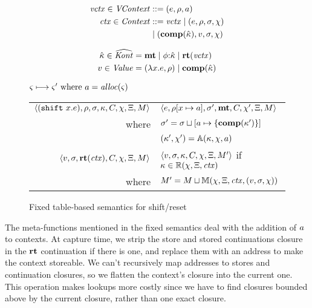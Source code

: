 \begin{center}
  \begin{minipage}{0.50\linewidth}
    \begin{align*}
      \mathit{vctx} \in \mathit{VContext} &::= (e,\rho,a) \\
      \mathit{ctx} \in \mathit{Context} &::= \mathit{vctx} \mathrel{\mid}
      (e,\rho,\sigma,\chi) \\ &\mathrel{\mid} (\mathbf{comp}(\hat{\kappa}),
      v, \sigma, \chi)
    \end{align*}
  \end{minipage}
  \begin{minipage}{0.45\linewidth}
    \begin{align*}
      \hat{\kappa} \in \widehat{\mathit{Kont}} &= \mathbf{mt} \mathrel{\mid} \phi{\tt :} \hat{\kappa} \mathrel{\mid} \mathbf{rt}(\mathit{vctx}) \\
      v \in \mathit{Value} &= (\lambda{} x. e, \rho) \mathrel{\mid}
      \mathbf{comp}(\hat{\kappa})
    \end{align*}
  \end{minipage}
\end{center}

\begin{figure*}
  \centering
  $\varsigma \longmapsto \varsigma' \text{ where } a = \mathit{alloc}(\varsigma)$ \\
  \begin{tabular}{r|l}
    \hline
    $\langle (\texttt{shift}\ x. e), \rho, \sigma, \kappa, C, \chi, \Xi, M \rangle$
    &
    $\langle e, \rho[x \mapsto a], \sigma',\mathbf{mt},C, \chi', \Xi,M \rangle$
    \\
    where & $\sigma' = \sigma\sqcup[a \mapsto \{ \mathbf{comp}(\kappa') \}]$ \\
    & $(\kappa',\chi') = {\mathbb A}(\kappa, \chi, a)$
\\
   $\langle v, \sigma, \mathbf{rt}(\mathit{ctx}), C, \chi, \Xi, M \rangle$
   &
   $\langle v, \sigma, \kappa, C, \chi, \Xi, M' \rangle$
   if $\kappa \in {\mathbb R}(\chi, \Xi, \mathit{ctx})$
   \\
   where & $M' = M \sqcup {\mathbb M}(\chi, \Xi, \mathit{ctx}, (v, \sigma, \chi))$
  \end{tabular}
  \caption{Fixed table-based semantics for shift/reset}
  \label{fig:shift-reset-table1}
\end{figure*}

The meta-functions mentioned in the fixed semantics deal with the addition of $a$ to contexts.
%
At capture time, we strip the store and stored continuations closure in the $\mathbf{rt}$ continuation if there is one, and replace them with an address to make the context storeable.
%
We can't recursively map addresses to stores and continuation closures, so we flatten the context's closure into the current one.
%
This operation makes lookups more costly since we have to find closures bounded above by the current closure, rather than one exact closure.

